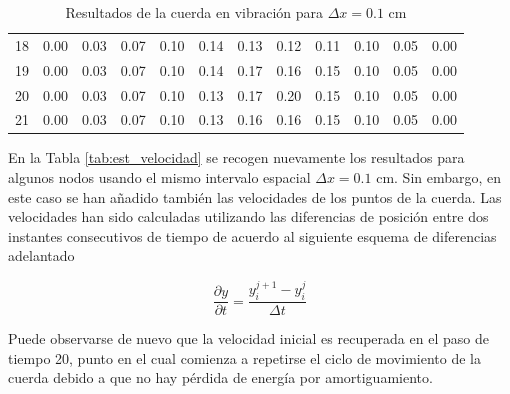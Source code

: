 \documentclass[11pt]{article}
\begin{document}
\begin{table}
\begin{small}
\begin{tabular}{ c c c c c c c c c c c c }
18 & 0.00 & 0.03 & 0.07 & 0.10 & 0.14 & 0.13 & 0.12 & 0.11 & 0.10 & 0.05 & 0.00 \\
19 & 0.00 & 0.03 & 0.07 & 0.10 & 0.14 & 0.17 & 0.16 & 0.15 & 0.10 & 0.05 & 0.00 \\
\hline
20 & 0.00 & 0.03 & 0.07 & 0.10 & 0.13 & 0.17 & 0.20 & 0.15 & 0.10 & 0.05 & 0.00 \\
\hline
21 & 0.00 & 0.03 & 0.07 & 0.10 & 0.13 & 0.16 & 0.16 & 0.15 & 0.10 & 0.05 & 0.00 \\
\end{tabular}
\end{small}
\caption{Resultados de la cuerda en vibración para $\Delta{x} = 0.1$ cm}
\label{tab:est_freq}
\end{table}

En la Tabla \ref{tab:est_velocidad} se recogen nuevamente los resultados para algunos nodos
usando el mismo intervalo espacial $\Delta{x} = 0.1$ cm. Sin embargo, en este caso se han
añadido también las velocidades de los puntos de la cuerda. Las velocidades han sido
calculadas utilizando las diferencias de posición entre dos instantes consecutivos de
tiempo de acuerdo al siguiente esquema de diferencias adelantado

\begin{equation}
\frac{\partial{y}}{\partial{t}} = \frac{y^{j + 1}_i - y^{j}_i}{\Delta{t}}
\end{equation} 

Puede observarse de nuevo que la velocidad inicial es recuperada en el paso de tiempo 20,
punto en el cual comienza a repetirse el ciclo de movimiento de la cuerda debido a que no
hay pérdida de energía por amortiguamiento.
\end{document}
